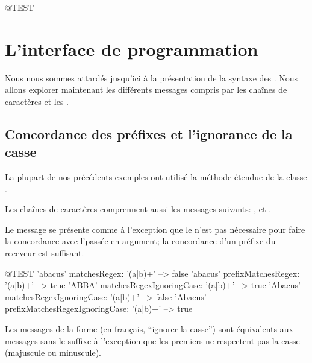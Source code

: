 \documentclass[a4paper,10pt,twoside]{book}
\begin{document}
\begin{code}{@TEST}
\section{L'interface de programmation \pkgregex}

Nous nous sommes attardés jusqu'ici à la présentation de la syntaxe
des \expregs. Nous allons explorer maintenant les différents messages
compris par les chaînes de caractères et les \expregs.

\subsection{Concordance des préfixes et l'ignorance de la casse}

La plupart de nos précédents exemples ont utilisé la méthode étendue
 de la classe .

Les chaînes de caractères comprennent aussi les messages suivants:
,  et
\mbox{.}

Le message  se présente comme
 à l'exception que le 
n'est pas nécessaire pour faire la concordance avec l'\expreg passée
en argument; la concordance d'un préfixe du receveur est suffisant.
\begin{code}{@TEST}
'abacus' matchesRegex: '(a|b)+'                                --> false
'abacus' prefixMatchesRegex: '(a|b)+'                       --> true
'ABBA' matchesRegexIgnoringCase: '(a|b)+'            --> true
'Abacus' matchesRegexIgnoringCase: '(a|b)+'          --> false
'Abacus' prefixMatchesRegexIgnoringCase: '(a|b)+' --> true
\end{code}

Les messages de la forme  (en français,
  ``ignorer la casse'') sont équivalents aux messages sans le suffixe
  à l'exception que les premiers ne respectent pas la casse (majuscule
ou minuscule).


\end{code}
\end{document}
